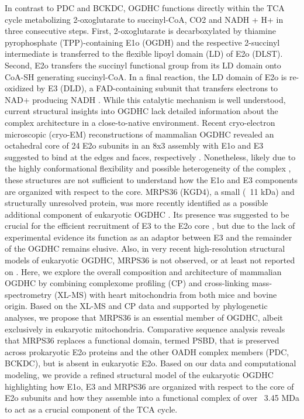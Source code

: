 In contrast to PDC and BCKDC, OGDHC functions directly within the TCA cycle metabolizing 2-oxoglutarate to succinyl-CoA, CO2 and NADH + H+ in three consecutive steps. First, 2-oxoglutarate is decarboxylated by thiamine pyrophosphate (TPP)-containing E1o (OGDH) and the respective 2-succinyl intermediate is transferred to the flexible lipoyl domain (LD) of E2o (DLST). Second, E2o transfers the succinyl functional group from its LD domain onto CoA-SH generating succinyl-CoA. In a final reaction, the LD domain of E2o is re-oxidized by E3 (DLD), a FAD-containing subunit that transfers electrons to NAD+ producing NADH \cite{Kyrilis_2021,Qi_2011}. While this catalytic mechanism is well understood, current structural insights into OGDHC lack detailed information about the complex architecture \cite{Frank_2007,Knapp_1998,Ricaud_1996,Robien_1992} in a close-to-native environment. Recent cryo-electron microscopic (cryo-EM) reconstructions of mammalian OGDHC revealed an octahedral core of 24 E2o subunits in an 8x3 assembly with E1o and E3 suggested to bind at the edges and faces, respectively \cite{Liu_2022,Nagy_2021}. Nonetheless, likely due to the highly conformational flexibility and possible heterogeneity of the complex \cite{Lengyel_2008}, these structures are not sufficient to understand how the E1o and E3 components are organized with respect to the core. MRPS36 (KGD4), a small (~11 kDa) and structurally unresolved protein, was more recently identified as a possible additional component of eukaryotic OGDHC \cite{Chatzispyrou_2018,Guerrero-Castillo_2021,Heublein_2014}. Its presence was suggested to be crucial for the efficient recruitment of E3 to the E2o core \cite{Heublein_2014}, but due to the lack of experimental evidence its function as an adaptor between E3 and the remainder of the OGDHC remains elusive. Also, in very recent high-resolution structural models of eukaryotic OGDHC, MRPS36 is not observed, or at least not reported on \cite{Liu_2022,Nagy_2021}.
\raggedbottom
Here, we explore the overall composition and architecture of mammalian OGDHC by combining complexome profiling (CP) \cite{Cabrera-Orefice_2021,Hevler_2021a} and cross-linking mass-spectrometry (XL-MS) with heart mitochondria from both mice and bovine origin. Based on the XL-MS and CP data and supported by phylogenetic analyses, we propose that MRPS36 is an essential member of OGDHC, albeit exclusively in eukaryotic mitochondria. Comparative sequence analysis reveals that MRPS36 replaces a functional domain, termed PSBD, that is preserved across prokaryotic E2o proteins and the other OADH complex members (PDC, BCKDC), but is absent in eukaryotic E2o. Based on our data and computational modeling, we provide a refined structural model of the eukaryotic OGDHC highlighting how E1o, E3 and MRPS36 are organized with respect to the core of E2o subunits and how they assemble into a functional complex of over ~3.45 MDa to act as a crucial component of the TCA cycle.
\pagebreak
%
